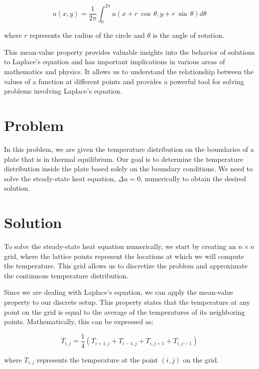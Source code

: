 \documentclass{article}
\begin{document}
\begin{multicols}{2}
\begin{equation}
  u(x,y) = \frac{1}{2\pi} \int_{0}^{2\pi}u(x + r \: \cos\,\theta, y + r \: \sin\,\theta) d\theta
\end{equation}

where $r$ represents the radius of the circle and $\theta$ is the angle of rotation.

This mean-value property provides valuable insights into the behavior of solutions to Laplace's equation and has important implications in various areas of mathematics and physics. It allows us to understand the relationship between the values of a function at different points and provides a powerful tool for solving problems involving Laplace's equation. \cite{anton}

\section{Problem}
In this problem, we are given the temperature distribution on the boundaries of a plate that is in thermal equilibrium. Our goal is to determine the temperature distribution inside the plate based solely on the boundary conditions. We need to solve the steady-state heat equation, $\Delta u = 0$, numerically to obtain the desired solution.

\section{Solution}
To solve the steady-state heat equation numerically, we start by creating an $n\times n$ grid, where the lattice points represent the locations at which we will compute the temperature. This grid allows us to discretize the problem and approximate the continuous temperature distribution.

Since we are dealing with Laplace's equation, we can apply the mean-value property to our discrete setup. This property states that the temperature at any point on the grid is equal to the average of the temperatures of its neighboring points. Mathematically, this can be expressed as:

\begin{equation}
  T_{i, j} = \frac{1}{4} ( T_{i+1,j} + T_{i-1,j} + T_{i,j+1} + T_{i,j-1})
\end{equation}

where $T_{i, j}$ represents the temperature at the point $(i,j)$ on the grid.


\end{multicols}
\end{document}
